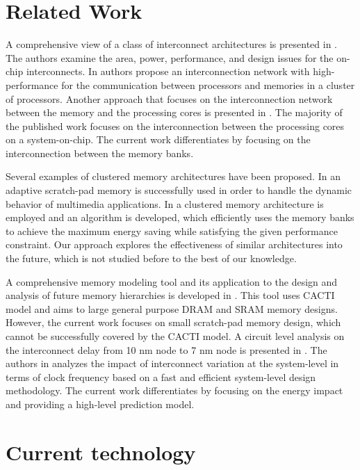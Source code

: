 \section{Related Work}
\label{relatedE}

A comprehensive view of a class of interconnect architectures is presented in \cite{kumar2005interconnections}. 
The authors examine the area, power, performance, and design issues for the on-chip interconnects.
In \cite{rahimi2011fully} authors propose an interconnection network with high-performance for the communication between processors and memories in a cluster of processors.
Another approach that focuses on the interconnection network between the memory and the processing cores is presented in \cite{kang2012high}. 
The majority of the published work focuses on the interconnection between the processing cores on a system-on-chip.
The current work differentiates by focusing on the interconnection between the memory banks.

Several examples of clustered memory architectures have been proposed.
In \cite{cho2009adaptive} an adaptive scratch-pad memory is successfully used in order to handle the dynamic behavior of multimedia applications.
In \cite{wang2005energy} a clustered memory architecture is employed and an algorithm is developed, which efficiently uses the memory banks to achieve the maximum energy saving while satisfying the given performance constraint.
Our approach explores the effectiveness of similar architectures into the future, which is not studied before to the best of our knowledge.

A comprehensive memory modeling tool and its application to the design and analysis of future memory hierarchies is developed in \cite{thoziyoor2008comprehensive}. 
This tool uses CACTI model and aims to large general purpose DRAM and SRAM memory designs.
However, the current work focuses on small scratch-pad memory design, which cannot be successfully covered by the CACTI model.
A circuit level analysis on the interconnect delay from 10 nm node to 7 nm node is presented in \cite{pan2014system}.
The authors in \cite{chen2014interconnect} analyzes the impact of interconnect variation at the system-level in terms of clock frequency based on a fast and efficient system-level design methodology. 
The current work differentiates by focusing on the energy impact and providing a high-level prediction model.

\section{Current technology}
\label{Current}

